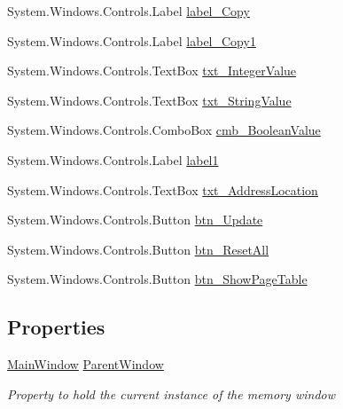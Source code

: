 \begin{DoxyCompactItemize}
\item 
System.\+Windows.\+Controls.\+Label \hyperlink{class_c_p_u___o_s___simulator_1_1_memory_window_a663f25aef0cd9c3755f100b3507b5f84}{label\+\_\+\+Copy}
\item 
System.\+Windows.\+Controls.\+Label \hyperlink{class_c_p_u___o_s___simulator_1_1_memory_window_a0f501c04b3319ae43e681335e50eeba4}{label\+\_\+\+Copy1}
\item 
System.\+Windows.\+Controls.\+Text\+Box \hyperlink{class_c_p_u___o_s___simulator_1_1_memory_window_af1ad9478de6dac0b4476c51b42849ecf}{txt\+\_\+\+Integer\+Value}
\item 
System.\+Windows.\+Controls.\+Text\+Box \hyperlink{class_c_p_u___o_s___simulator_1_1_memory_window_aca8e57432af036b698d0eeaaa765c483}{txt\+\_\+\+String\+Value}
\item 
System.\+Windows.\+Controls.\+Combo\+Box \hyperlink{class_c_p_u___o_s___simulator_1_1_memory_window_a2a1da5df6a425ce20c7b639fa66c58f2}{cmb\+\_\+\+Boolean\+Value}
\item 
System.\+Windows.\+Controls.\+Label \hyperlink{class_c_p_u___o_s___simulator_1_1_memory_window_ae35c7d3110d7cf96493d6fa68274e858}{label1}
\item 
System.\+Windows.\+Controls.\+Text\+Box \hyperlink{class_c_p_u___o_s___simulator_1_1_memory_window_a3f766ac6c531af3b14248819947d9023}{txt\+\_\+\+Address\+Location}
\item 
System.\+Windows.\+Controls.\+Button \hyperlink{class_c_p_u___o_s___simulator_1_1_memory_window_a9274df08bf008c43b325e50d6db6067f}{btn\+\_\+\+Update}
\item 
System.\+Windows.\+Controls.\+Button \hyperlink{class_c_p_u___o_s___simulator_1_1_memory_window_aeeefcad9b4510fd7fd5899f3a2db4786}{btn\+\_\+\+Reset\+All}
\item 
System.\+Windows.\+Controls.\+Button \hyperlink{class_c_p_u___o_s___simulator_1_1_memory_window_a62372edf818561f1584160d41c2f67f7}{btn\+\_\+\+Show\+Page\+Table}
\end{DoxyCompactItemize}
\subsection*{Properties}
\begin{DoxyCompactItemize}
\item 
\hyperlink{class_c_p_u___o_s___simulator_1_1_main_window}{Main\+Window} \hyperlink{class_c_p_u___o_s___simulator_1_1_memory_window_ad61b6543a424be98fd0a4e0fa732f3d4}{Parent\+Window}
\begin{DoxyCompactList}\small\item\em Property to hold the current instance of the memory window \end{DoxyCompactList}\end{DoxyCompactItemize}
